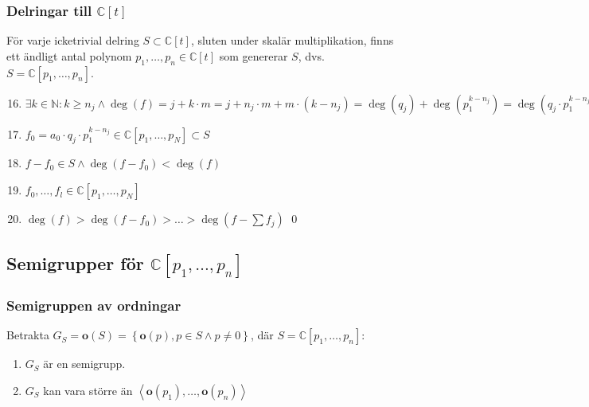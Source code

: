 \documentclass{beamer}
\begin{document}
\begin{frame}
	\frametitle{Delringar till $\mathbb{C}[t]$}
	\begin{Theorem}
		För varje icketrivial delring $S \subset \mathbb{C}[t]$, sluten under skalär multiplikation, finns ett ändligt antal polynom $p_1,\ldots,p_n \in \mathbb{C}[t]$ som genererar $S$, dvs. $S=\mathbb{C}[p_1,\ldots,p_n]$.
	\end{Theorem}
	
	\begin{enumerate}
		\setcounter{enumi}{15}
		\item<1->$\exists k \in \mathbb{N} : k\geq n_j \wedge \deg(f) = j + k\cdot m = j + n_j\cdot m + m\cdot(k-n_j) =\deg(q_j)+\deg(p_1^{k-n_j}) = \deg(q_j\cdot p_1^{k-n_j})$
		\item<2->$f_0 = a_0\cdot q_j\cdot p_1^{k-n_j} \in \mathbb{C}[p_1,\ldots,p_N] \subset S$
		\item<3->$f-f_0 \in S \wedge \deg(f-f_0)<\deg(f)$
		\item<4->$f_0,\ldots,f_l \in \mathbb{C}[p_1,\ldots,p_N]$
		\item<5->$\deg(f)>\deg(f-f_0)>\ldots>\deg(f-\sum f_j)$
		\qed
	\end{enumerate}
\end{frame}



\subsection{Semigrupper för $\mathbb{C}[p_1,\ldots,p_n]$}

\begin{frame}
	\frametitle{Semigruppen av ordningar}
	Betrakta $G_S = \mathbf{o}(S) = \left\{\mathbf{o}(p), p \in S \wedge p \neq 0 \right\}$, där $S=\mathbb{C}[p_1,\ldots,p_n]$:
	
	\begin{enumerate}
		\item<2-> $G_S$ är en semigrupp.
		\item<3-> $G_S$ kan vara större än $\left<\mathbf{o}(p_1),\ldots,\mathbf{o}(p_n)\right>$
	\end{enumerate}
		
\end{frame}
\end{document}
